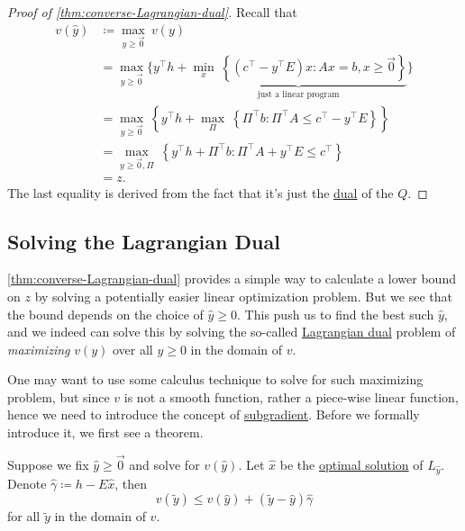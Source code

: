 \begin{proof}[Proof of \autoref{thm:converse-Lagrangian-dual}]
	Recall that
	\[
		\begin{split}
			v(\hat{y}) & \coloneqq \max_{y\geq \vec{0}}\ v(y)                                                                                                                                      \\
			           & = \max_{y\geq \vec{0}} \Bigg\{y^{\top}h + \underbrace{\min_{x}\ \left\{(c^{\top} - y^{\top}E)x\colon Ax = b, x\geq \vec{0}\right\}}_{\text{just a linear program}}\Bigg\} \\
			           & = \max_{y\geq \vec{0}}\ \left\{y^{\top}h + \max_{\Pi}\ \left\{\Pi^{\top}b\colon \Pi^{\top}A\leq c^{\top} - y^{\top}E\right\}\right\}                                      \\
			           & = \max_{y\geq \vec{0}, \Pi}\ \left\{y^{\top}h + \Pi^{\top}b\colon \Pi^{\top}A + y^{\top}E\leq c^{\top}\right\}                                                            \\
			           & = z.
		\end{split}
	\]
	The last equality is derived from the fact that it's just the \hyperref[def:dual]{dual} of the \(Q\).
\end{proof}

\subsection{Solving the Lagrangian Dual}
\begin{intuition}
	\autoref{thm:converse-Lagrangian-dual} provides a simple way to calculate a lower bound on \(z\) by solving a potentially easier linear optimization problem. But we see that the bound depends on the choice of \(\hat{y}\geq 0\). This push us to find the best such \(\hat{y}\), and we indeed can solve this by solving the so-called \hyperref[def:Lagrangian-dual]{Lagrangian dual} problem of \emph{maximizing} \(v(y)\) over all \(y\geq 0\) in the domain of \(v\).
\end{intuition}

One may want to use some calculus technique to solve for such maximizing problem, but since \(v\) is not a smooth function, rather a piece-wise linear function, hence we need to introduce the concept of \hyperref[def:subgradient]{subgradient}. Before we formally introduce it, we first see a theorem.

\begin{theorem}\label{thm:lec19-1}
	Suppose we fix \(\hat{y}\geq \vec{0}\) and solve for \(v(\hat{y})\). Let \(\hat{x}\) be the \hyperref[def:optimal-solution]{optimal solution} of \(L_{\hat{y}}\). Denote \(\hat{\gamma}\coloneqq h - E \hat{x}\), then
	\[
		v(\widetilde{y})\leq v(\hat{y})+(\widetilde{y} - \hat{y})\hat{\gamma}
	\]
	for all \(\widetilde{y}\) in the domain of \(v\).
	\begin{center}
	\end{center}
\end{theorem}

